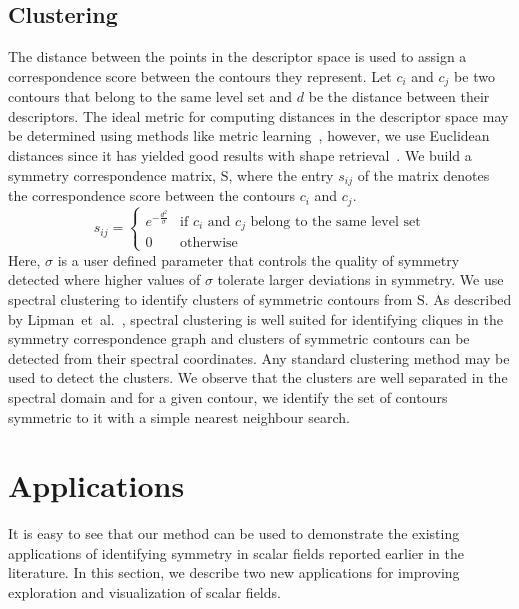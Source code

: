 \documentclass[review,journal]{vgtc}         %
\begin{document}
\subsection{Clustering}\label{clust}
The distance between the points in the descriptor space is used to assign 
a correspondence score between the contours they represent. Let $c_i$
and $c_j$ be two contours that belong to the same level set and $d$ be
the distance between their descriptors. The ideal metric for computing
distances in the descriptor space may be determined using methods like
metric learning~\cite{Kulis13}, however, we use
Euclidean distances since it has yielded good results with shape 
retrieval~\cite{reuter2006laplace,lian2013}. We build a symmetry
correspondence matrix, $\mathrm{S}$, where the entry $s_{ij}$ of the
matrix denotes the correspondence score between the contours $c_i$
and $c_j$.
$$s_{ij} = 
\begin{cases}
	e^{-\frac{d^2}{\sigma}} & \text{if $c_i$ and $c_j$ belong to the same level set}\\
	0 & \text{otherwise}
\end{cases}
$$
Here, $\sigma$ is a user defined parameter that controls the quality of symmetry detected
where higher values of $\sigma$ tolerate larger deviations in symmetry. We use spectral clustering
to identify clusters of symmetric contours from $\mathrm{S}$. As described by 
Lipman~et~al.~\cite{Lip10}, spectral clustering is well suited for identifying
cliques in the symmetry correspondence graph and clusters of symmetric
contours can be detected from their spectral coordinates. Any standard clustering
method may be used to detect the clusters. We observe that the clusters
are well separated in the spectral domain and for a given contour, we identify
the set of contours symmetric to it with a simple nearest neighbour search.
\section{Applications}
It is easy to see that our method can be used to demonstrate the existing
applications of identifying symmetry in scalar fields reported earlier
in the literature. In this section, we describe two new applications
for improving exploration and visualization of scalar fields.
\end{document}
